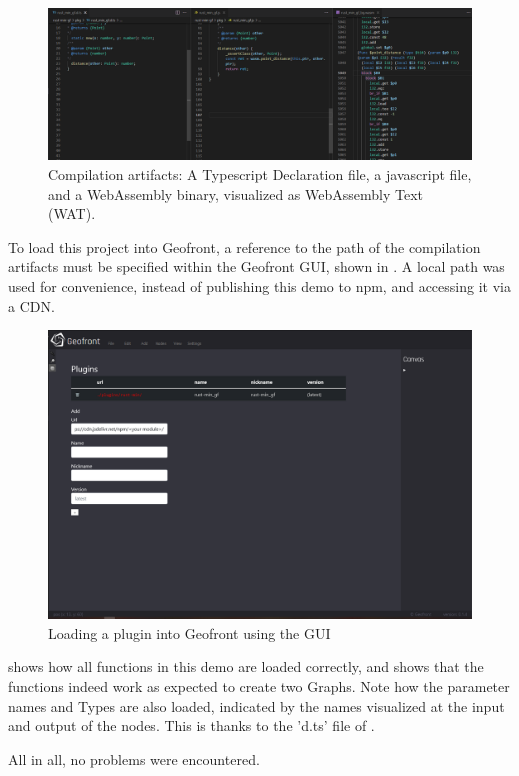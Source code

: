 \begin{figure}
  \graphicspath{{../../assets/images/6.1.1/}}
  \centering
  \includegraphics[width=\linewidth]{13.PNG}
  \caption[compilation artifacts]{Compilation artifacts: A Typescript Declaration file, a javascript file, and a WebAssembly binary, visualized as WebAssembly Text (WAT). }
  \label{fig:rust-plugin:compilation-results}
\end{figure}

To load this project into Geofront, a reference to the path of the compilation artifacts must be specified within the Geofront GUI, shown in .
A local path was used for convenience, instead of publishing this demo to npm, and accessing it via a \ac{CDN}.

\begin{figure}
  \graphicspath{{../../assets/images/6.1.1/}}
  \centering
  \includegraphics[width=0.50\linewidth]{2.PNG}
  \caption[loading a plugin]{Loading a plugin into Geofront using the \ac{GUI}}
  \label{fig:min-rust-plugin-import}
\end{figure}

 shows how all functions in this demo are loaded correctly, and  shows that the functions indeed work as expected to create two Graphs. 
Note how the parameter names and Types are also loaded, indicated by the names visualized at the input and output of the nodes.
This is thanks to the 'd.ts' file of .

All in all, no problems were encountered.

